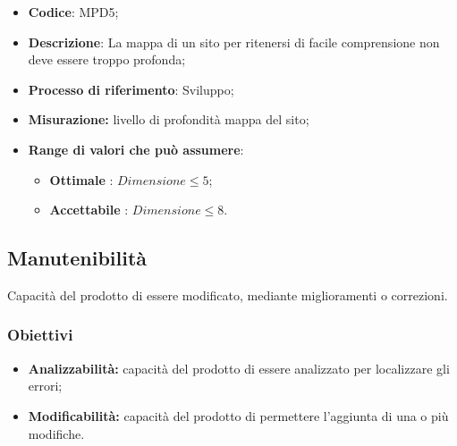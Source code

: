 \vspace{-1cm}
\begin{itemize}
	\item \textbf{Codice}: MPD5;
	\item \textbf{Descrizione}: La mappa di un sito per ritenersi di facile comprensione non deve essere troppo profonda;
	\item \textbf{Processo di riferimento}: Sviluppo;
	\item \textbf{Misurazione:} livello di profondità mappa del sito;
	\item \textbf{Range di valori che può assumere}: 
		\begin{itemize}
			\item \textbf{Ottimale} : $Dimensione \leq5$;
			\item \textbf{Accettabile} : $Dimensione \leq8$.
		\end{itemize}
\end{itemize}
\subsection{Manutenibilità}
Capacità del prodotto di essere modificato, mediante miglioramenti o correzioni.
\subsubsection{Obiettivi}
\begin{itemize}
	\item \textbf{Analizzabilità:} capacità del prodotto di essere analizzato per localizzare gli errori;
	\item \textbf{Modificabilità:} capacità del prodotto di permettere l'aggiunta di una o più modifiche.
\end{itemize}
